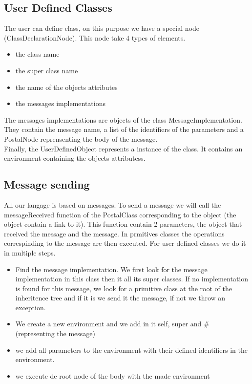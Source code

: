 \documentclass{eplDoc}
\begin{document}
\subsection{User Defined Classes}
The user can define class, on this purpose we have a special node (ClassDeclarationNode). This node take 4 types of elements.  
\begin{itemize}
	\item the class name
	\item the super class name
	\item the name of the objects attributes
	\item the messages implementations
\end{itemize}

The messages implementations are objects of the class MessageImplementation.  They contain the message name, a list of the identifiers of the parameters and a PostalNode reprensenting the body of the message.
\\
Finally, the UserDefinedObject represents a instance of the class.  It contains an environment containing the objects attributess.

\subsection{Message sending}
All our langage is based on messages.  To send a message we will call the messageReceived function of the PostalClass corresponding to the object (the object contain a link to it).  This function contain 2 parameters, the object that received the message and the message.  In prmitives classes the operations correspinding to the message are then executed.  For user defined classes we do it in multiple steps.
\begin{itemize}
	\item Find the message implementation.  We first look for the message implementation in this class then it all its super classes.  If no implementation is found for this message, we look for a primitive class at the root of the inheritence tree and if it is we send it the message, if not we throw an exception.
	\item We create a new environment and we add in it self, super and # (representing the message)
	\item we add all parameters to the environment with their defined identifiers in the environment.
	\item we execute de root node of the body with the made environment
\end{itemize}
\end{document}
